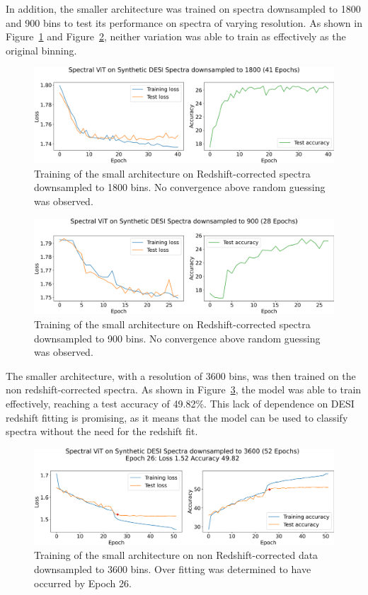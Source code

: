 In addition, the smaller architecture was trained on spectra downsampled to 1800 and 900 bins to test 
its performance on spectra of varying resolution. As shown in Figure~\ref{fig:vit1.2_training} and Figure~\ref{fig:vit1.3_training},
neither variation was able to train as effectively as the original binning. 
\begin{figure}
    \centering
    \includegraphics[width=.8\linewidth]{figures/vit_model_V1.2training_new.png}
    \caption{Training of the small architecture on Redshift-corrected spectra downsampled to 1800 bins. No convergence above random guessing was observed. }
    \label{fig:vit1.2_training}
\end{figure}

\begin{figure}
    \centering
    \includegraphics[width=.8\linewidth]{figures/vit_model_V1.3_muchsmallermodeltraining_new.png}
    \caption{Training of the small architecture on Redshift-corrected spectra downsampled to 900 bins. No convergence above random guessing was observed. }
    \label{fig:vit1.3_training}
\end{figure}

The smaller architecture, with a resolution of 3600 bins, was then trained on the
non redshift-corrected spectra. As shown in Figure~\ref{fig:vit2_training},
the model was able to train effectively, reaching a test accuracy of 49.82\%. 
This lack of dependence on DESI redshift fitting is promising, as it means that 
the model can be used to classify spectra without the need for the redshift fit. 


\begin{figure}
    \centering
    \includegraphics[width=.8\linewidth]{figures/v2_real/vit_model_V2training_new.png}
    \caption{Training of the small architecture on non Redshift-corrected data downsampled to 3600 bins. Over fitting was determined to have occurred by Epoch 26.}
    \label{fig:vit2_training}
\end{figure}
